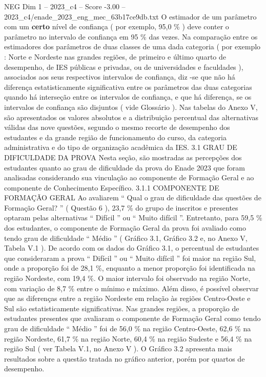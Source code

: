 \begin{textsample}{NEG Dim 1 – 2023\_c4 – Score -3.00 – 2023\_c4/enade\_2023\_eng\_mec\_63b17ce9db.txt}
O estimador de um parâmetro com um \textbf{certo} nível de confiança ( por exemplo, 95,0 \% ) deve conter o parâmetro no intervalo de confiança em 95 \% das vezes.
Na comparação entre os estimadores dos parâmetros de duas classes de uma dada categoria ( por exemplo : Norte e Nordeste nas grandes regiões, de primeiro e último quarto de desempenho, de IES públicas e privadas, ou de universidades e faculdades ), associados aos seus respectivos intervalos de confiança, diz -se que não há diferença estatisticamente significativa entre os parâmetros das duas categorias quando há interseção entre os intervalos de confiança, e que há diferença, se os intervalos de confiança são disjuntos ( vide Glossário ).
Nas tabelas do Anexo V, são apresentados os valores absolutos e a distribuição percentual das alternativas válidas das nove questões, segundo o mesmo recorte de desempenho dos estudantes e da grande região de funcionamento do curso, da categoria administrativa e do tipo de organização acadêmica da IES. 3.1 GRAU DE DIFICULDADE DA PROVA Nesta seção, são mostradas as percepções dos estudantes quanto ao grau de dificuldade da prova do Enade 2023 que foram analisadas considerando sua vinculação ao componente de Formação Geral e ao componente de Conhecimento Específico. 3.1.1 COMPONENTE DE FORMAÇÃO GERAL Ao avaliarem “ Qual o grau de dificuldade das questões de Formação Geral? ” ( Questão 6 ), 23,7 \% do grupo de inscritos e presentes optaram pelas alternativas “ Difícil ” ou “ Muito difícil ”.
Entretanto, para 59,5 \% dos estudantes, o componente de Formação Geral da prova foi avaliado como tendo grau de dificuldade “ Médio ” ( Gráfico 3.1, Gráfico 3.2 e, no Anexo V, Tabela V.1 ).
De acordo com os dados do Gráfico 3.1, o percentual de estudantes que consideraram a prova “ Difícil ” ou “ Muito difícil ” foi maior na região Sul, onde a proporção foi de 28,1 \%, enquanto a menor proporção foi identificada na região Nordeste, com 19,4 \%.
O maior intervalo foi observado na região Norte, com variação de 8,7 \% entre o mínimo e máximo.
Além disso, é possível observar que as diferenças entre a região Nordeste em relação às regiões Centro-Oeste e Sul são estatisticamente significativas.
Nas grandes regiões, a proporção de estudantes presentes que avaliaram o componente de Formação Geral como tendo grau de dificuldade “ Médio ” foi de 56,0 \% na região Centro-Oeste, 62,6 \% na região Nordeste, 61,7 \% na região Norte, 60,4 \% na região Sudeste e 56,4 \% na região Sul ( ver Tabela V.1, no Anexo V ).
O Gráfico 3.2 apresenta mais resultados sobre a questão tratada no gráfico anterior, porém por quartos de desempenho.

\end{textsample}
